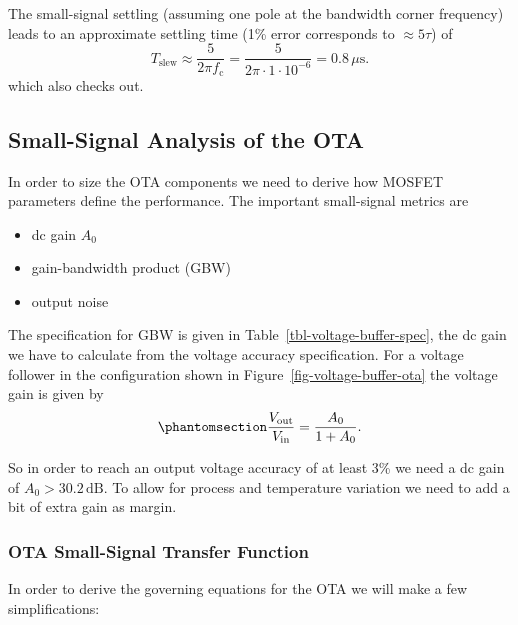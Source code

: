\documentclass[
  a4paper,
  DIV=11,
  numbers=noendperiod]{scrartcl}
\providecommand{\tightlist}{%
  \setlength{\itemsep}{0pt}\setlength{\parskip}{0pt}}\usepackage{longtable,booktabs,array}
\begin{document}
The small-signal settling (assuming one pole at the bandwidth corner
frequency) leads to an approximate settling time (1\% error corresponds
to \(\approx 5 \tau\)) of \[
T_\mathrm{slew} \approx \frac{5}{2 \pi f_\mathrm{c}} = \frac{5}{2 \pi \cdot 1 \cdot 10^{-6}} = 0.8\,\mu\text{s}.
\] which also checks out.

\subsection{Small-Signal Analysis of the
OTA}\label{sec-basic-ota-small-signal}

In order to size the OTA components we need to derive how MOSFET
parameters define the performance. The important small-signal metrics
are

\begin{itemize}
\tightlist
\item
  dc gain \(A_0\)
\item
  gain-bandwidth product (GBW)
\item
  output noise
\end{itemize}

The specification for GBW is given in
Table~\ref{tbl-voltage-buffer-spec}, the dc gain we have to calculate
from the voltage accuracy specification. For a voltage follower in the
configuration shown in Figure~\ref{fig-voltage-buffer-ota} the voltage
gain is given by
\begin{equation}\phantomsection\label{eq-voltage-buffer-tolerance}{
\frac{V_\mathrm{out}}{V_\mathrm{in}} = \frac{A_0}{1 + A_0}.
}\end{equation}

So in order to reach an output voltage accuracy of at least 3\% we need
a dc gain of \(A_0 > 30.2\,\text{dB}\). To allow for process and
temperature variation we need to add a bit of extra gain as margin.

\subsubsection{OTA Small-Signal Transfer
Function}\label{ota-small-signal-transfer-function}

In order to derive the governing equations for the OTA we will make a
few simplifications:
\end{document}
